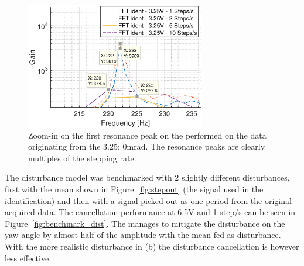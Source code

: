\begin{figure}[h!]
  \centering
  \includegraphics[width=0.7\textwidth]{fig/matlab/fft_mean_in_out_3V_zoomin.eps}
  \caption{\label{fig:3vzoomin} Zoom-in on the first resonance peak on the \abbrFFT performed on the data originating from the 3.25: 0mrad. The resonance peaks are clearly multiples of the stepping rate.}
\end{figure}
\FloatBarrier

The disturbance model was benchmarked with 2 slightly different disturbances, first with the mean shown in Figure~\ref{fig:stepout} (the signal used in the identification) and then with a signal picked out as one period from the original acquired data. The cancellation performance  at 6.5V and 1 step/s can be seen in Figure~\ref{fig:benchmark_dist}. The \abbrFDC manages to mitigate the disturbance on the yaw angle by almost half of the amplitude with the mean fed as disturbance. With the more realistic disturbance in (b) the disturbance cancellation is however less effective.

